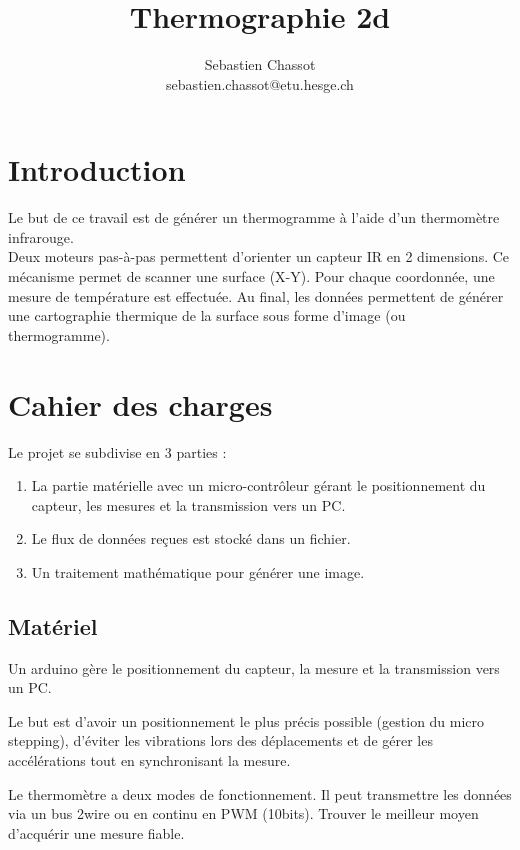 \documentclass[10pt,a4paper]{article}
\title{Thermographie 2d }
\author{Sebastien Chassot \\ sebastien.chassot@etu.hesge.ch}
\affil{HES-SO - hepia - section ITI \\ Université d'été}
\begin{document}
\maketitle




\section*{Introduction}

Le but de ce travail est de générer un thermogramme à l'aide d'un thermomètre infrarouge.\\

Deux moteurs pas-à-pas permettent d'orienter un capteur IR en 2 dimensions. Ce mécanisme permet de scanner une surface (X-Y). Pour chaque coordonnée, une mesure de température est effectuée. Au final, les données permettent de générer une cartographie thermique de la surface sous forme d'image (ou thermogramme).

\section*{Cahier des charges}

Le projet se subdivise en 3 parties :

\begin{enumerate}
\item La partie matérielle avec un micro-contrôleur gérant le positionnement du capteur, les mesures et la transmission vers un PC.
\item Le flux de données reçues est stocké dans un fichier.
\item Un traitement mathématique pour générer une image.
\end{enumerate}

\subsection*{Matériel}

Un arduino gère le positionnement du capteur, la mesure et la transmission vers un PC.

Le but est d'avoir un positionnement le plus précis possible (gestion du micro stepping), d'éviter les vibrations lors des déplacements et de gérer les accélérations tout en synchronisant la mesure.

Le thermomètre a deux modes de fonctionnement. Il peut transmettre les données via un bus 2wire ou en continu en PWM (10bits). Trouver le meilleur moyen d'acquérir une mesure fiable.
\end{document}
